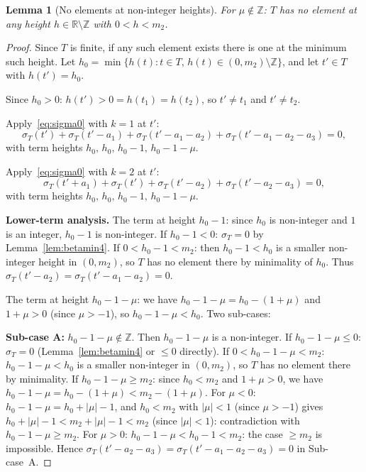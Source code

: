 \documentclass{article}
\newtheorem{lemma}{Lemma}
\begin{document}
\begin{lemma}[No elements at non-integer heights]\label{lem:nogaps}
For $\mu\notin\mathbb{Z}$\textup{:}
$T$ has no element at any height $h\in\mathbb{R}\setminus\mathbb{Z}$ with $0<h<m_2$.
\end{lemma}
\begin{proof}
Since $T$ is finite, if any such element exists there is one at the minimum
such height.  Let $h_0=\min\{h(t):t\in T,\,h(t)\in(0,m_2)\setminus\mathbb{Z}\}$,
and let $t'\in T$ with $h(t')=h_0$.

Since $h_0>0$: $h(t')>0=h(t_1)=h(t_2)$, so $t'\ne t_1$ and $t'\ne t_2$.

Apply~\eqref{eq:sigma0} with $k=1$ at $t'$:
\begin{equation}\label{eq:k1t}
  \sigma_T(t')+\sigma_T(t'-a_1)+\sigma_T(t'-a_1-a_2)+\sigma_T(t'-a_1-a_2-a_3)=0,
\end{equation}
with term heights $h_0,\,h_0,\,h_0-1,\,h_0-1-\mu$.

Apply~\eqref{eq:sigma0} with $k=2$ at $t'$:
\begin{equation}\label{eq:k2t}
  \sigma_T(t'+a_1)+\sigma_T(t')+\sigma_T(t'-a_2)+\sigma_T(t'-a_2-a_3)=0,
\end{equation}
with term heights $h_0,\,h_0,\,h_0-1,\,h_0-1-\mu$.

\textbf{Lower-term analysis.}
The term at height $h_0-1$: since $h_0$ is non-integer and $1$ is an integer,
$h_0-1$ is non-integer.  If $h_0-1<0$: $\sigma_T=0$ by Lemma~\ref{lem:betamin4}.
If $0<h_0-1<m_2$: then $h_0-1<h_0$ is a smaller non-integer height in $(0,m_2)$,
so $T$ has no element there by minimality of $h_0$.  Thus $\sigma_T(t'-a_2)=\sigma_T(t'-a_1-a_2)=0$.

The term at height $h_0-1-\mu$: we have $h_0-1-\mu = h_0-(1+\mu)$ and
$1+\mu>0$ (since $\mu>-1$), so $h_0-1-\mu<h_0$.  Two sub-cases:

\textbf{Sub-case A:} $h_0-1-\mu\notin\mathbb{Z}$.  Then $h_0-1-\mu$ is a non-integer.
If $h_0-1-\mu\le 0$: $\sigma_T=0$ (Lemma~\ref{lem:betamin4} or $\le 0$ directly).
If $0<h_0-1-\mu<m_2$: $h_0-1-\mu<h_0$ is a smaller non-integer in $(0,m_2)$,
so $T$ has no element there by minimality.
If $h_0-1-\mu\ge m_2$: since $h_0<m_2$ and $1+\mu>0$, we have $h_0-1-\mu=h_0-(1+\mu)<m_2-(1+\mu)$.
For $\mu<0$: $h_0-1-\mu=h_0+|\mu|-1$, and $h_0<m_2$ with $|\mu|<1$ (since $\mu>-1$) gives
$h_0+|\mu|-1<m_2+|\mu|-1<m_2$ (since $|\mu|<1$): contradiction with $h_0-1-\mu\ge m_2$.
For $\mu>0$: $h_0-1-\mu<h_0-1<m_2$: the case $\ge m_2$ is impossible.
Hence $\sigma_T(t'-a_2-a_3)=\sigma_T(t'-a_1-a_2-a_3)=0$ in Sub-case~A.


\end{proof}
\end{document}

